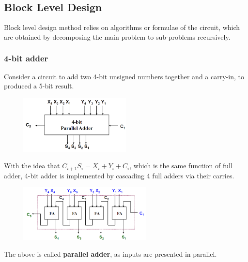 \documentclass[12pt]{article}
\theoremstyle{definition}
\begin{document}
\subsection{Block Level Design}
Block level design method relies on algorithms or formulae of the circuit, which are obtained by decomposing the main problem to sub-problems recursively.
\subsubsection{4-bit adder}
Consider a circuit to add two 4-bit unsigned numbers together and a carry-in, to produced a 5-bit result.
\begin{figure}[h]
\centering
\includegraphics[width = 0.5\textwidth]{6_4.png}
\end{figure}
With the idea that $C_{i+1}S_i = X_i+Y_i +C_i$, which is the same function of full adder, 4-bit adder is implemented by cascading 4 full adders via their carries.
\begin{figure}[h]
\centering
\includegraphics[width = 0.6\textwidth]{6_5.png}
\end{figure}
The above is called \textbf{parallel adder}, as inputs are presented in parallel.
\end{document}
